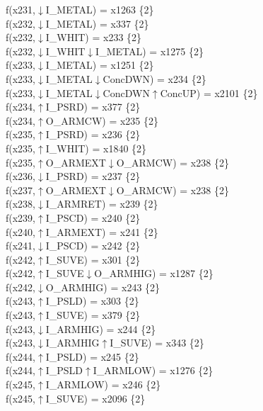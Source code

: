 f(x231,$\downarrow$I\_METAL) = x1263 \{2\} \\  
f(x232,$\downarrow$I\_METAL) = x337 \{2\} \\  
f(x232,$\downarrow$I\_WHIT) = x233 \{2\} \\  
f(x232,$\downarrow$I\_WHIT$\downarrow$I\_METAL) = x1275 \{2\} \\  
f(x233,$\downarrow$I\_METAL) = x1251 \{2\} \\  
f(x233,$\downarrow$I\_METAL$\downarrow$ConcDWN) = x234 \{2\} \\  
f(x233,$\downarrow$I\_METAL$\downarrow$ConcDWN$\uparrow$ConcUP) = x2101 \{2\} \\  
f(x234,$\uparrow$I\_PSRD) = x377 \{2\} \\  
f(x234,$\uparrow$O\_ARMCW) = x235 \{2\} \\  
f(x235,$\uparrow$I\_PSRD) = x236 \{2\} \\  
f(x235,$\uparrow$I\_WHIT) = x1840 \{2\} \\  
f(x235,$\uparrow$O\_ARMEXT$\downarrow$O\_ARMCW) = x238 \{2\} \\  
f(x236,$\downarrow$I\_PSRD) = x237 \{2\} \\  
f(x237,$\uparrow$O\_ARMEXT$\downarrow$O\_ARMCW) = x238 \{2\} \\  
f(x238,$\downarrow$I\_ARMRET) = x239 \{2\} \\  
f(x239,$\uparrow$I\_PSCD) = x240 \{2\} \\  
f(x240,$\uparrow$I\_ARMEXT) = x241 \{2\} \\  
f(x241,$\downarrow$I\_PSCD) = x242 \{2\} \\  
f(x242,$\uparrow$I\_SUVE) = x301 \{2\} \\  
f(x242,$\uparrow$I\_SUVE$\downarrow$O\_ARMHIG) = x1287 \{2\} \\  
f(x242,$\downarrow$O\_ARMHIG) = x243 \{2\} \\  
f(x243,$\uparrow$I\_PSLD) = x303 \{2\} \\  
f(x243,$\uparrow$I\_SUVE) = x379 \{2\} \\  
f(x243,$\downarrow$I\_ARMHIG) = x244 \{2\} \\  
f(x243,$\downarrow$I\_ARMHIG$\uparrow$I\_SUVE) = x343 \{2\} \\  
f(x244,$\uparrow$I\_PSLD) = x245 \{2\} \\  
f(x244,$\uparrow$I\_PSLD$\uparrow$I\_ARMLOW) = x1276 \{2\} \\  
f(x245,$\uparrow$I\_ARMLOW) = x246 \{2\} \\  
f(x245,$\uparrow$I\_SUVE) = x2096 \{2\} \\  
